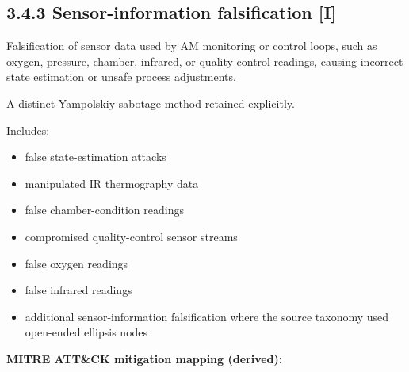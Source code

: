 \documentclass[10pt,a4paper,oneside]{report}
\begin{document}
\subsection{3.4.3 Sensor-information falsification [I]}


Falsification of sensor data used by AM monitoring or control loops, such as oxygen, pressure, chamber, infrared, or quality-control readings, causing incorrect state estimation or unsafe process adjustments.

A distinct Yampolskiy sabotage method retained explicitly.

Includes:

\begin{itemize}
\item false state-estimation attacks
\item manipulated IR thermography data
\item false chamber-condition readings
\item compromised quality-control sensor streams
\item false oxygen readings
\item false infrared readings
\item additional sensor-information falsification where the source taxonomy used open-ended ellipsis nodes
\end{itemize}

\textbf{MITRE ATT\&CK mitigation mapping (derived):}
\end{document}
